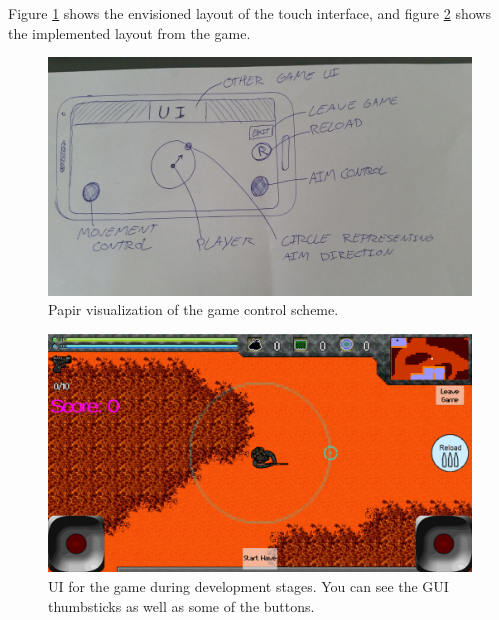 Figure \ref{sec:modules:controlscheme:prototype} shows the envisioned layout of the touch interface, and figure \ref{sec:modules:controlscheme:touch:controls:ui} shows the implemented layout from the game.
\begin{figure}[H]
\centering
\includegraphics[width=.75\textwidth]{figures/controlscheme/prototype}
\caption{Papir visualization of the game control scheme.}
\label{sec:modules:controlscheme:prototype}
\end{figure}

\begin{figure}[H]
\centering
\includegraphics[width=.75\textwidth]{figures/controlscheme/ui}
\caption{UI for the game during development stages. You can see the GUI thumbsticks as well as some of the buttons.}
\label{sec:modules:controlscheme:touch:controls:ui}
\end{figure}